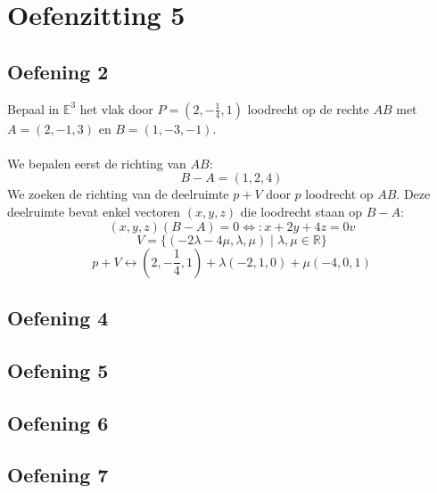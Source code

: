 \documentclass[main.tex]{subfiles}
\begin{document}
\section{Oefenzitting 5}

\subsection*{Oefening 2}
Bepaal in $\mathbb{E}^{3}$ het vlak door $P=\left(2,-\frac{1}{4},1\right)$ loodrecht op de rechte $AB$ met $A=(2,-1,3)$ en $B=(1,-3,-1)$.\\\\
We bepalen eerst de richting van $AB$:
\[ B-A=(1,2,4) \]
We zoeken de richting van de deelruimte $p+V$ door $p$ loodrecht op $AB$.
Deze deelruimte bevat enkel vectoren $(x,y,z)$ die loodrecht staan op $B-A$:
\[ (x,y,z)(B-A) = 0 \Leftrightarrow: x+2y+4z = 0 v\]
\[ V = \{ (-2\lambda-4\mu,\lambda,\mu) \mid \lambda,\mu \in \mathbb{R}\} \]
\[ p+V \leftrightarrow \left(2,-\frac{1}{4},1\right) + \lambda(-2,1,0) + \mu(-4,0,1) \]
\subsection*{Oefening 4}
\subsection*{Oefening 5}
\subsection*{Oefening 6}
\subsection*{Oefening 7}
\end{document}
